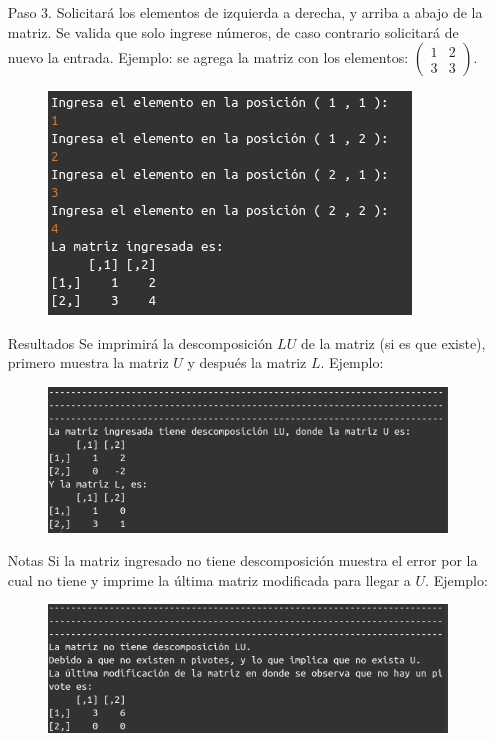\documentclass[11pt,letterpaper]{article}
\begin{document}
\begin{enumerate}
\begin{itemize}
\item[Paso 3.] Solicitará los elementos de izquierda a derecha, y arriba a abajo de la matriz. Se valida que solo ingrese números, de caso contrario solicitará de nuevo la entrada. Ejemplo: se agrega la matriz con los elementos: $\begin{pmatrix}
1&2\\
3&3
\end{pmatrix}$.
\begin{figure}[H]
\centering
\includegraphics[scale=.7]{paso_3.png}
\end{figure}

\item[Resultados] Se imprimirá la descomposición $LU$ de la matriz (si es que existe), primero muestra la matriz $U$ y después la matriz $L$. Ejemplo:
\begin{figure}[H]
\centering
\includegraphics[scale=.7]{LU_resultados.png}
\end{figure}

\item[Notas] Si la matriz ingresado no tiene descomposición muestra el error por la cual no tiene y imprime la última matriz modificada para llegar a $U$. Ejemplo:
\begin{figure}[H]
\centering
\includegraphics[scale=.7]{LU_nota.png}
\end{figure}
\end{itemize}



\end{enumerate}
\end{document}
